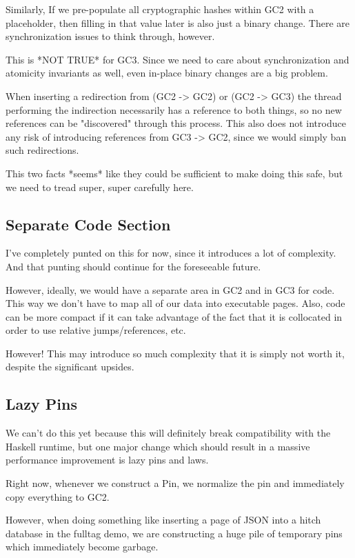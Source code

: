 Similarly, If we pre-populate all cryptographic hashes within GC2 with
a placeholder, then filling in that value later is also just a binary
change.  There are synchronization issues to think through, however.

This is *NOT TRUE* for GC3. Since we need to care about synchronization
and atomicity invariants as well, even in-place binary changes are a
big problem.

When inserting a redirection from (GC2 -> GC2) or (GC2 -> GC3) the thread
performing the indirection necessarily has a reference to both things,
so no new references can be "discovered" through this process.  This also
does not introduce any risk of introducing references from GC3 -> GC2,
since we would simply ban such redirections.

This two facts *seems* like they could be sufficient to make doing this
safe, but we need to tread super, super carefully here.

\subsection{Separate Code Section}

I've completely punted on this for now, since it introduces a lot of
complexity.  And that punting should continue for the foreseeable future.

However, ideally, we would have a separate area in GC2 and in GC3 for
code.  This way we don't have to map all of our data into executable
pages.  Also, code can be more compact if it can take advantage of the
fact that it is collocated in order to use relative jumps/references, etc.

However!  This may introduce so much complexity that it is simply not
worth it, despite the significant upsides.

\subsection{Lazy Pins}

We can't do this yet because this will definitely break compatibility
with the Haskell runtime, but one major change which should result in
a massive performance improvement is lazy pins and laws.

Right now, whenever we construct a Pin, we normalize the pin and
immediately copy everything to GC2.

However, when doing something like inserting a page of JSON into a hitch
database in the fulltag demo, we are constructing a huge pile of temporary
pins which immediately become garbage.

